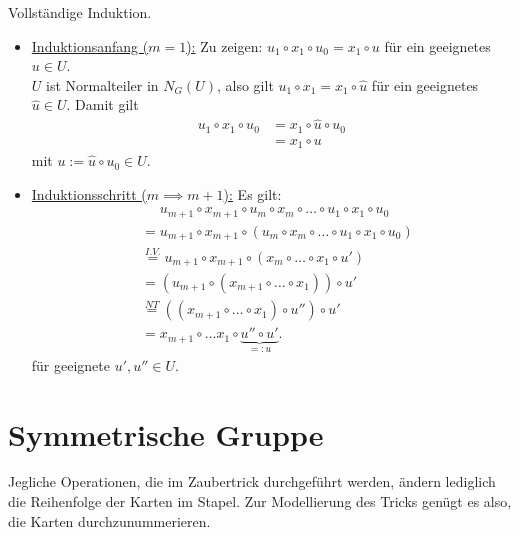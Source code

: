 \documentclass[a4paper]{article}
\begin{document}
    \begin{beweis}
        Vollständige Induktion.
        \begin{itemize}
            \item \underline{Induktionsanfang ($m=1$):}
                Zu zeigen: $u_1 \circ x_1 \circ u_0 = x_1 \circ u$ für ein geeignetes $u \in U$. \\
                $U$ ist Normalteiler in $N_G(U)$, also gilt $u_1 \circ x_1 = x_1 \circ \hat{u}$ für ein geeignetes $\hat{u} \in U$. Damit gilt 
                \begin{align*}
                    u_1 \circ x_1 \circ u_0 &= x_1 \circ \hat{u} \circ u_0 \\
                                            &= x_1 \circ u
                \end{align*}
                mit $u := \hat{u} \circ u_0 \in U$.

            \item \underline{Induktionsschritt ($m \implies m+1$):}
                Es gilt:
                \begin{align*}
                    &\phantom{=} u_{m+1} \circ x_{m+1} \circ u_m \circ x_m \circ \ldots \circ u_1 \circ x_1 \circ u_0 \\
                    &= u_{m+1} \circ x_{m+1} \circ (u_m \circ x_m \circ \ldots \circ u_1 \circ x_1 \circ u_0) \\
                    &\overset{I.V.}{=}u_{m+1} \circ x_{m+1} \circ (x_m \circ \ldots \circ x_1 \circ u')  \\
                    &= (u_{m+1} \circ (x_{m+1} \circ \ldots \circ x_1)) \circ u' \\
                    &\overset{NT}{=} ((x_{m+1} \circ \ldots \circ x_1) \circ u'') \circ u' \\
                    &= x_{m+1} \circ \ldots x_1 \circ \underbrace{u'' \circ u'}_{=: u} 
                .\end{align*}
                für geeignete $u', u'' \in U$.
        \end{itemize}
    \end{beweis}

    \section{Symmetrische Gruppe}
    Jegliche Operationen, die im Zaubertrick durchgeführt werden, ändern lediglich die Reihenfolge der Karten im Stapel. Zur Modellierung des Tricks genügt es also, die Karten durchzunummerieren. \\
   
\end{document}
